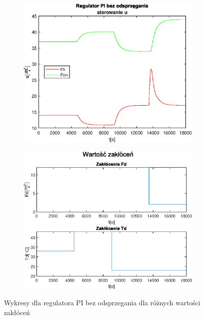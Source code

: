 \begin{figure}[h!]
   \begin{subfigure}[b]{0.4\textwidth}
      \includegraphics[width=1\linewidth]{img/PI/noDecoupler/disturbance/PINoDecouplerControl3DisttrueLinfalse.eps}
      \caption{}
      \label{fig:fig:PIDecoupler3DisttrueLinfalse3}
   \end{subfigure}
       
   \begin{subfigure}[b]{0.4\textwidth}
      \includegraphics[width=1\linewidth]{img/PI/noDecoupler/disturbance/PIDecouplerDisturbance3DisttrueLinfalse.eps}
      \caption{}
      \label{fig:fig:PIDecoupler3DisttrueLinfalse4}
   \end{subfigure}
       
   \caption{Wykresy dla regulatora PI bez odsprzegania dla różnych wartości zakłóceń}
   \label{fig:PIDecoupler3DisttrueLinfalse}
\end{figure}
           
